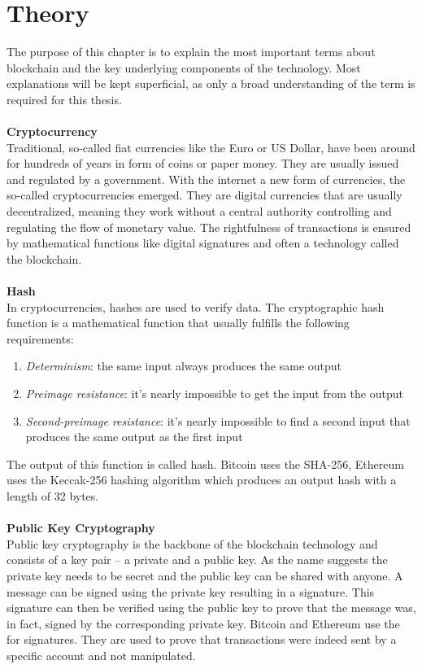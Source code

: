 \section{Theory}
The purpose of this chapter is to explain the most important terms about blockchain and the key underlying components of the technology.
Most explanations will be kept superficial, as only a broad understanding of the term is required for this thesis.
\\\\

\textbf{Cryptocurrency}\\
Traditional, so-called fiat currencies like the Euro or US Dollar, have been around for hundreds of years in form of coins or paper money.
They are usually issued and regulated by a government.
With the internet a new form of currencies, the so-called cryptocurrencies emerged.
They are digital currencies that are usually decentralized, meaning they work without a central authority controlling and regulating the flow of monetary value.
The rightfulness of transactions is ensured by mathematical functions like digital signatures and often a technology called the blockchain.
\\\\

\textbf{Hash}\\
In cryptocurrencies, hashes are used to verify data.
The cryptographic hash function is a mathematical function that usually fulfills the following requirements\cite{hash}:
\begin{enumerate}
    \item \textit{Determinism}: the same input always produces the same output
    \item \textit{Preimage resistance}: it's nearly impossible to get the input from the output
    \item \textit{Second-preimage resistance}: it's nearly impossible to find a second input that produces the same output as the first input
\end{enumerate}
The output of this function is called hash.
Bitcoin uses the SHA-256\cite{bitcoin-whitepaper}, Ethereum uses the Keccak-256\cite{ethereum-yellow-paper} hashing algorithm which produces an output hash with a length of 32 bytes.
\\\\

\textbf{Public Key Cryptography}\\
Public key cryptography\cite{public-key-cryptography} is the backbone of the blockchain technology and consists of a key pair – a private and a public key.
As the name suggests the private key needs to be secret and the public key can be shared with anyone.
A message can be signed using the private key resulting in a signature.
This signature can then be verified using the public key to prove that the message was, in fact, signed by the corresponding private key.
Bitcoin and Ethereum use the  for signatures.
They are used to prove that transactions were indeed sent by a specific account and not manipulated.
\newpage

